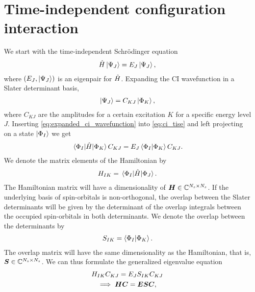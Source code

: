     \section{Time-independent configuration interaction}
        We start with the time-independent Schrödinger equation
        \begin{align}
            \hat{H}\ket{\Psi_J} = E_J\ket{\Psi_J},
            \label{eq:ci_tise}
        \end{align}
        where $(E_J, \ket{\Psi_J})$ is an eigenpair for $\hat{H}$.
        Expanding the CI wavefunction in a Slater determinant basis,
        \begin{align}
            \ket{\Psi_J} = C_{KJ}\ket{\Phi_K},
            \label{eq:expanded_ci_wavefunction}
        \end{align}
        where $C_{KJ}$ are the amplitudes for a certain excitation $K$ for a
        specific energy level $J$.
        Inserting \autoref{eq:expanded_ci_wavefunction} into
        \autoref{eq:ci_tise} and left projecting on a state $\ket{\Phi_I}$ we
        get
        \begin{align}
            \mel{\Phi_I}{\hat{H}}{\Phi_K}C_{KJ}
            = E_J\braket{\Phi_I}{\Phi_K}C_{KJ}.
        \end{align}
        We denote the matrix elements of the Hamiltonian by
        \begin{align}
            H_{IK}
            = \mel{\Phi_I}{\hat{H}}{\Phi_J}.
        \end{align}
        The Hamiltonian matrix will have a dimensionality of $\boldsymbol{H} \in
        \mathbb{C}^{N_s \times N_s}$.
        If the underlying basis of spin-orbitals is non-orthogonal, the overlap
        between the Slater determinants will be given by the determinant of the
        overlap integrals between the occupied spin-orbitals in both
        determinants.
        We denote the overlap between the determinants by
        \begin{align}
            S_{IK} = \braket{\Phi_I}{\Phi_K}.
        \end{align}
        The overlap matrix will have the same dimensionality as the Hamiltonian,
        that is, $\boldsymbol{S} \in \mathbb{C}^{N_s \times N_s}$.
        We can thus formulate the generalized eigenvalue equation
        \begin{gather}
            H_{IK}C_{KJ} = E_J S_{IK}C_{KJ}
            \\
            \implies
            \boldsymbol{H} \boldsymbol{C} = \boldsymbol{E} \boldsymbol{S} \boldsymbol{C},
            \label{eq:ci-generalized}
        \end{gather}
